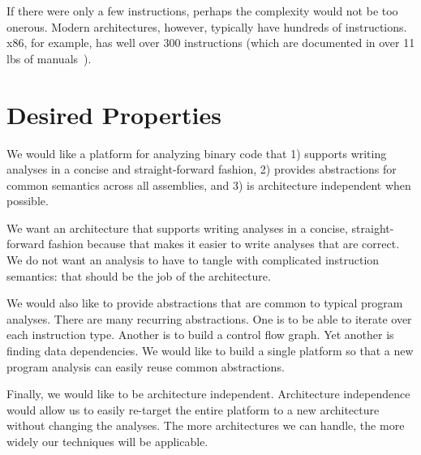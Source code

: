 If there were only a few instructions, perhaps the complexity would
not be too onerous.  Modern architectures, however, typically have
hundreds of instructions. x86, for example, has well over 300
instructions (which are documented in over 11 lbs of
manuals~\cite{intel:x86}).



\section{Desired Properties}

We would like a platform for analyzing binary code that 1) supports
writing analyses in a concise and straight-forward fashion, 2)
provides abstractions for common semantics across all assemblies, and
3) is architecture independent when possible.

We want an architecture that supports writing analyses in a concise,
straight-forward fashion because that makes it easier to write
analyses that are correct.  We do not want an analysis to have to
tangle with complicated instruction semantics: that should be the
job of the architecture.  

We would also like to provide abstractions that are common to typical
program analyses. There are many recurring abstractions. One is to be
able to iterate over each instruction type. Another is to build a
control flow graph.  Yet another is finding data dependencies. We
would like to build a single platform so that a new program analysis
can easily reuse common abstractions.

Finally, we would like to be architecture independent.  Architecture
independence would allow us to easily re-target the entire platform to
a new architecture without changing the analyses.  The more
architectures we can handle, the more widely our techniques will be
applicable.



